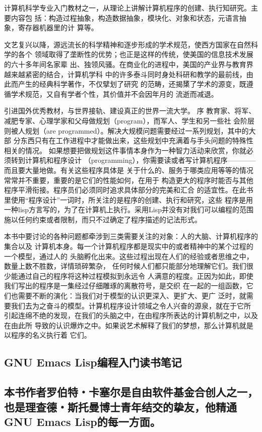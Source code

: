 \documentclass[11pt]{ctexart}
\begin{document}
计算机科学专业入门教材之一，从理论上讲解计算机程序的创建、执行知研究。主要内容包
括：构造过程抽象，构造数据抽象，模块化、对象和状态，元语言抽象，寄存器机器里的计
算等。

文艺复兴以降，源远流长的科学精神和逐步形成的学术规范，使西方国家在自然科学的各个
领域取得了垄断性的优势；也正是这样的传统，使美国的信息技术发展的六十多年间名家辈
出、独领风骚。在商业化的进程中，美国的产业界与教育界越来越紧密的结合，计算机学科
中的许多泰斗同时身处科研和教学的最前线，由此而产生的经典科学著作，不仅擘划了研究
的范畴，还揭橥了学术的源变，既遵循学术规范，又自有学者个性，其价值并不会因年月的
流逝而减退。

引进国外优秀教材，与世界接轨、建设真正的世界一流大学。
序
教育家、将军、减肥专家、心理学家和父母做规划（program），而军人、学生和另一些社
会阶层则被人规划（are programmed）。解决大规模问题需要经过一系列规划，其中的大部
分东西只有在工作进程中才能做出来，这些规划中充满着与手头问题的特殊性相关的情况。
如果想要把做规划这件事情本身作为一种智力活动来欣赏，你就必须转到计算机和程序设计
（programming），你需要读或者写计算机程序————而且要大量地做。有关这些程序具体是
关于什么的、服务于哪类应用等等的情况常常并不重要，重要的是它们的性能如何，在用于
构造更大的程序时能否与其他程序平滑衔接。程序员们必须同时追求具体部分的完美和汇合
的适宜性。在此书里使用“程序设计”一词时，所关注的是程序的创建、执行和研究，这些
程序是用一种lisp方言写的，为了在计算机上执行。采用Lisp并没有对我们可以编程的范围
施以任何约束或者限制，而只不过确定了程序描述的记法形式。

本书中要讨论的各种问题都牵涉到三类需要关注的对象：人的大脑、计算机程序的集合以及
计算机本身。每一个计算机程序都是现实中的或者精神中的某个过程的一个模型，通过人的
头脑孵化出来。这些过程出现在人们的经验或者思维之中，数量上数不胜数，详情琐碎繁杂，
任何时候人们都只能部分地理解它们。我们很少能通过自己的程序将这种过程模拟到永远令
人满意的程度。正因为如此，即使我们写出的程序是一集经过仔细雕琢的离散符号，是交织
在一起的一组函数，它们也需要不断的演化：当我们对于模型的认识更深入、更扩大、更广
泛时，就需要我们去为之奋斗的模型。计算机程序设计领域之令人兴奋的源泉，就在于它所
引起连绵不绝的发现，在我们的头脑之中，在由程序所表达的计算机制之中，以及在由此所
导致的认识爆炸之中。如果说艺术解释了我们的梦想，那么计算机就是以程序的名义执行着
它们。
\subsection{GNU Emacs Lisp编程入门读书笔记}
\label{sec:org49066de}
\subsection{本书作者罗伯特・卡塞尔是自由软件基金合创人之一，也是理查德・斯托曼博士青年结交的挚友，他精通GNU Emacs Lisp的每一方面。}
\label{sec:org922f184}
\end{document}
